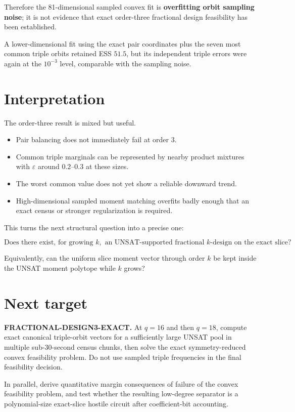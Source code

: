 \documentclass[11pt]{article}
\begin{document}
Therefore the 81-dimensional sampled convex fit is \textbf{overfitting orbit
sampling noise}; it is not evidence that exact order-three fractional design
feasibility has been established.

A lower-dimensional fit using the exact pair coordinates plus the seven most
common triple orbits retained ESS \(51.5\), but its independent triple errors
were again at the \(10^{-3}\) level, comparable with the sampling noise.

\section{Interpretation}

The order-three result is mixed but useful.

\begin{itemize}
\item Pair balancing does not immediately fail at order 3.
\item Common triple marginals can be represented by nearby product mixtures
with \(\varepsilon\) around \(0.2\)--\(0.3\) at these sizes.
\item The worst common value does not yet show a reliable downward trend.
\item High-dimensional sampled moment matching overfits badly enough that an
exact census or stronger regularization is required.
\end{itemize}

This turns the next structural question into a precise one:

\[
\boxed{
\text{Does there exist, for growing }k,
\text{ an UNSAT-supported fractional }k\text{-design on the exact slice?}
}
\]

Equivalently, can the uniform slice moment vector through order \(k\) be kept
inside the UNSAT moment polytope while \(k\) grows?

\section{Next target}

\textbf{FRACTIONAL-DESIGN3-EXACT.}
At \(q=16\) and then \(q=18\), compute exact canonical triple-orbit vectors
for a sufficiently large UNSAT pool in multiple sub-30-second census chunks,
then solve the exact symmetry-reduced convex feasibility problem.  Do not use
sampled triple frequencies in the final feasibility decision.

In parallel, derive quantitative margin consequences of failure of the convex
feasibility problem, and test whether the resulting low-degree separator is a
polynomial-size exact-slice hostile circuit after coefficient-bit accounting.
\end{document}
